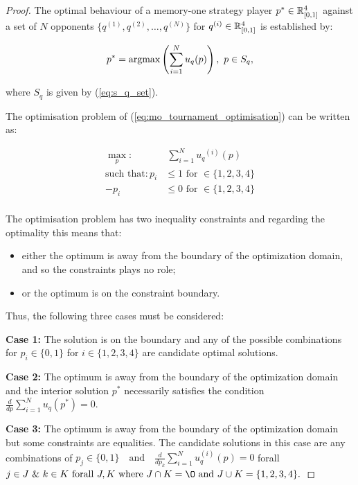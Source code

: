 \begin{proof}
The optimal behaviour of a memory-one strategy player
\(p^* \in \mathbb{R}_{[0, 1]} ^ 4\)
against a set of \(N\) opponents \(\{q^{(1)}, q^{(2)}, \dots, q^{(N)} \}\)
for \(q^{(i)} \in \mathbb{R}_{[0, 1]} ^ 4\) is established by:

\[p^* = \textnormal{argmax}\left(\sum\limits_{i=1} ^ N  u_q(p)\right), \ p \in S_q,\]

where \(S_q\) is given by (\ref{eq:s_q_set}).

The optimisation problem of (\ref{eq:mo_tournament_optimisation}) can be
written as:

\begin{equation}\label{eq:mo_tournament_optimisation_standard}
    \begin{aligned}
    \max_p: & \ \sum_{i=1} ^ {N} {u_q}^{(i)} (p)
    \\
    \text{such that}: p_i & \leq 1 \text{ for } \in \{1, 2, 3, 4\} \\
    - p_i & \leq 0 \text{ for } \in \{1, 2, 3, 4\} \\
    \end{aligned}
\end{equation}

The optimisation problem has two inequality constraints and regarding the optimality
this means that:

\begin{itemize}
    \item either the optimum is away from the boundary of the optimization domain, and so the constraints plays no role;
    \item or the optimum is on the constraint boundary.
\end{itemize}

Thus, the following three cases must be considered:

\textbf{Case 1:} The solution is on the boundary and any of the possible
combinations for $p_i \in \{0, 1\}$ for $i \in \{1, 2, 3, 4\}$ are candidate
optimal solutions.

\textbf{Case 2:} The optimum is away from the boundary of the optimization domain
and the interior solution $p^*$ necessarily satisfies the condition
\(\frac{d}{dp} \sum\limits_{i=1} ^ N  u_q(p^*) = 0\).

\textbf{Case 3:} The optimum is away from the boundary of the optimization domain
but some constraints are equalities. The candidate solutions in this case
are any combinations of $p_j \in \{0, 1\} \quad \text{and} \quad \frac{d}{dp_k} 
\sum\limits_{i=1} ^ N  u_q^{(i)}(p) = 0$ 
forall $ j \in J \text{ \& } k \in K \text{ forall } J, K
\text{ where } J \cap K = \O \text{ and } J \cup K = \{1, 2, 3, 4\}.$


\end{proof}
